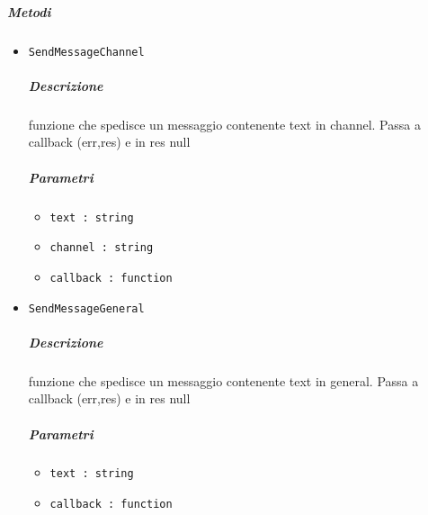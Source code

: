 \documentclass[../ManualeSviluppatore_v2.0.0.tex]{subfiles}
\begin{document}
\subparagraph{Metodi}\begin{itemize}
\item \texttt{SendMessageChannel}
\subparagraph{Descrizione} funzione che spedisce un messaggio contenente text in channel. Passa a callback (err,res) e in res null
\subparagraph{Parametri} \begin{itemize}
\item \texttt{text : string}
\item \texttt{channel : string}
\item \texttt{callback : function}
\end{itemize}
\item \texttt{SendMessageGeneral}
\subparagraph{Descrizione} funzione che spedisce un messaggio contenente text in general. Passa a callback (err,res) e in res null
\subparagraph{Parametri} \begin{itemize}
\item \texttt{text : string}
\item \texttt{callback : function}
\end{itemize}
\end{itemize}
\end{document}
